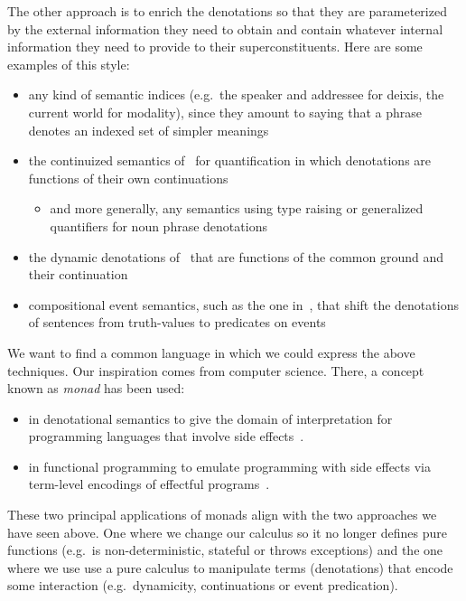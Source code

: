\documentclass{llncs}
\begin{document}
The other approach is to enrich the denotations so that they are
parameterized by the external information they need to obtain and contain
whatever internal information they need to provide to their
superconstituents. Here are some examples of this style:

\begin{itemize}
\item any kind of semantic indices (e.g.\ the speaker and addressee for
  deixis, the current world for modality), since they amount to saying that
  a phrase denotes an indexed set of simpler meanings
\item the continuized semantics of~\cite{barker2002continuations} for
  quantification in which denotations are functions of their own
  continuations
  \begin{itemize}
  \item and more generally, any semantics using type raising or generalized
    quantifiers for noun phrase denotations
  \end{itemize}
\item the dynamic denotations of~\cite{de2006towards} that are functions of
  the common ground and their continuation
\item compositional event semantics, such as the one
  in~\cite{qian2011event}, that shift the denotations of sentences from
  truth-values to predicates on events
\end{itemize}

We want to find a common language in which we could express the above
techniques. Our inspiration comes from computer science. There, a concept
known as \emph{monad} has been used:
\begin{itemize}
\item in denotational semantics to give the domain of interpretation for
  programming languages that involve side effects~\cite{moggi1991notions}.
\item in functional programming to emulate programming with side effects
  via term-level encodings of effectful programs~\cite{wadler1992essence}.
\end{itemize}
These two principal applications of monads align with the two approaches we
have seen above. One where we change our calculus so it no longer defines
pure functions (e.g.\ is non-deterministic, stateful or throws exceptions)
and the one where we use use a pure calculus to manipulate terms
(denotations) that encode some interaction (e.g.\ dynamicity, continuations
or event predication).
\end{document}

